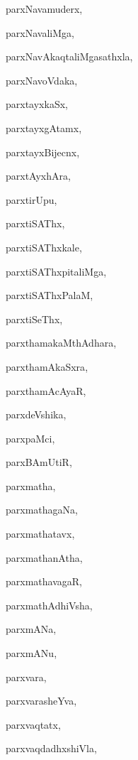 \begin{multicols}{2}
{parxNavamuderx}, \pageref{parxNavamuderx}

{parxNavaliMga}, \pageref{parxNavaliMga}

{parxNavAkaqtaliMgasathxla}, \pageref{parxNavAkaqtaliMgasathxla}

{parxNavoVdaka}, \pageref{parxNavoVdaka}

{parxtayxkaSx}, \pageref{parxtayxkaSx}

{parxtayxgAtamx}, \pageref{parxtayxgAtamx}

{parxtayxBijecnx}, \pageref{parxtayxBijecnx}

{parxtAyxhAra}, \pageref{parxtAyxhAra}

{parxtirUpu}, \pageref{parxtirUpu}

{parxtiSAThx}, \pageref{parxtiSAThx}

{parxtiSAThxkale}, \pageref{parxtiSAThxkale}

{parxtiSAThxpitaliMga}, \pageref{parxtiSAThxpitaliMga}

{parxtiSAThxPalaM}, \pageref{parxtiSAThxPalaM}

{parxtiSeThx}, \pageref{parxtiSeThx}

{parxthamakaMthAdhara}, \pageref{parxthamakaMthAdhara}

{parxthamAkaSxra}, \pageref{parxthamAkaSxra}

{parxthamAcAyaR}, \pageref{parxthamAcAyaR}

{parxdeVshika}, \pageref{parxdeVshika}

{parxpaMci}, \pageref{parxpaMci}

{parxBAmUtiR}, \pageref{parxBAmUtiR}

{parxmatha}, \pageref{parxmatha}

{parxmathagaNa}, \pageref{parxmathagaNa}

{parxmathatavx}, \pageref{parxmathatavx}

{parxmathanAtha}, \pageref{parxmathanAtha}

{parxmathavagaR}, \pageref{parxmathavagaR}

{parxmathAdhiVsha}, \pageref{parxmathAdhiVsha}

{parxmANa}, \pageref{parxmANa}

{parxmANu}, \pageref{parxmANu}

{parxvara}, \pageref{parxvara}

{parxvarasheYva}, \pageref{parxvarasheYva}

{parxvaqtatx}, \pageref{parxvaqtatx}

{parxvaqdadhxshiVla}, \pageref{parxvaqdadhxshiVla}


\end{multicols}
